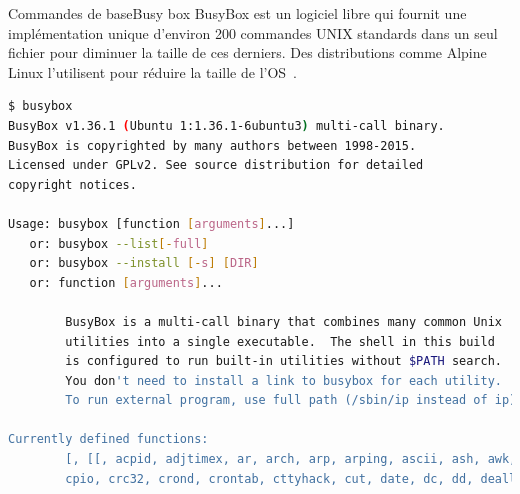 \documentclass{beamer}
\begin{document}
    \begin{frame}[fragile]{Commandes de base}{Busy box}
        BusyBox est un logiciel libre qui fournit une implémentation unique d'environ 200 commandes UNIX standards dans un seul fichier pour diminuer la taille de ces derniers.
        Des distributions comme Alpine Linux l'utilisent pour réduire la taille de l'OS~.
        \begin{lstlisting}[language=bash,basicstyle=\tiny\ttfamily]
$ busybox
BusyBox v1.36.1 (Ubuntu 1:1.36.1-6ubuntu3) multi-call binary.
BusyBox is copyrighted by many authors between 1998-2015.
Licensed under GPLv2. See source distribution for detailed
copyright notices.

Usage: busybox [function [arguments]...]
   or: busybox --list[-full]
   or: busybox --install [-s] [DIR]
   or: function [arguments]...

        BusyBox is a multi-call binary that combines many common Unix
        utilities into a single executable.  The shell in this build
        is configured to run built-in utilities without $PATH search.
        You don't need to install a link to busybox for each utility.
        To run external program, use full path (/sbin/ip instead of ip).

Currently defined functions:
        [, [[, acpid, adjtimex, ar, arch, arp, arping, ascii, ash, awk, base64, basename, bc, blkdiscard, blockdev, brctl, bunzip2, busybox, bzcat, bzip2, cal, cat, chgrp, chmod, chown, chpasswd, chroot, chvt, clear, cmp, cp,
        cpio, crc32, crond, crontab, cttyhack, cut, date, dc, dd, deallocvt, depmod, devmem, df, diff, dirname, dmesg, dnsdomainname, dos2unix, dpkg, dpkg-deb, du, dumpkmap, dumpleases, echo, ed,
        \end{lstlisting}
    \end{frame}
\end{document}
